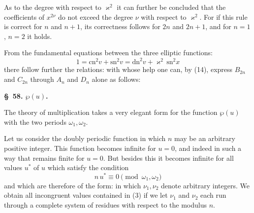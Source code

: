 
As to the degree with respect to $\varkappa^2$ it can further be concluded that
the coefficients of $x^{2\nu}$ do not exceed the degree $\nu$ with respect to
$\varkappa^2$. For if this rule is correct for $n$ and $n+1$, its correctness
follows for $2n$ and $2n+1$, and for $n=1$, $n=2$ it holds.

From the fundamental equations between the three elliptic functions:
\[
1 = \mathrm{cn}^2 v + \mathrm{sn}^2 v = \mathrm{dn}^2 v + \varkappa^2\,\mathrm{sn}^2 x %
\]
there follow further the relations:
with whose help one can, by (14), express $B_{2n}$ and $C_{2n}$ through $A_n$
and $D_n$ alone as follows:

\begin{center}
\textbf{\S\ 58.  $\wp(u)$.}
\end{center}

The theory of multiplication takes a very elegant form for the
 function $\wp(u)$ with the two periods $\omega_1, \omega_2$.

Let us consider the doubly periodic function
in which $n$ may be an arbitrary positive integer. This function becomes
infinite for $u=0$, and indeed in such a way that
remains finite for $u=0$. But besides this it becomes infinite for all values
$u^*$ of $u$ which satisfy the condition
\[
n\,u^* \equiv 0 \pmod{\omega_1,\omega_2}
\]
and which are therefore of the form:
in which $\nu_1, \nu_2$ denote arbitrary integers. We obtain all incongruent
values contained in (3) if we let $\nu_1$ and $\nu_2$ each run through a
complete system of residues with respect to the modulus $n$.
